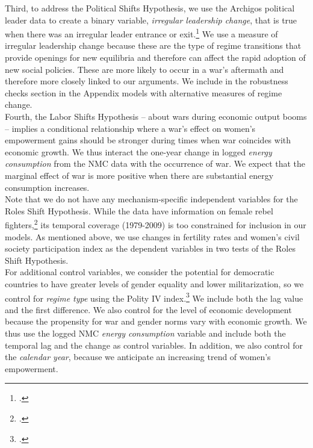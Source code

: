 \documentclass [12pt] {article}
\begin{document}
Third, to address the Political Shifts Hypothesis, we use the  Archigos political leader data  to create a binary variable, {\it irregular leadership change}, that is true when there was an irregular leader entrance or exit.\footnote{.} We use a measure of irregular leadership change because these are the type of regime transitions that provide openings for new equilibria and therefore can affect the rapid adoption of new social policies. These are more likely to occur in a war's aftermath and therefore more closely linked to our arguments. We include in the robustness checks section in the Appendix models with alternative measures of regime change.\\

Fourth, the Labor Shifts Hypothesis -- about wars during economic output booms -- implies a conditional relationship where a war's effect on women's empowerment gains should be stronger during times when war coincides with economic growth. We thus interact the one-year change in logged {\it energy consumption} from the NMC data with the occurrence of war. We expect that the marginal effect of war is more positive when there are substantial energy consumption increases.  \\

Note that we do not have any mechanism-specific independent variables for the Roles Shift Hypothesis. While the \citeauthor{thomas:wood} data have information on female rebel fighters,\footnote{.} its temporal coverage (1979-2009) is too constrained for inclusion in our models. As mentioned above, we use changes in fertility rates and women's civil society participation index as the dependent variables in two tests of the Roles Shift Hypothesis.\\

For additional control variables, we consider the potential for democratic countries to have greater levels of gender equality and lower militarization, so we control for {\it regime type} using the Polity IV index.\footnote{.}  We include both the lag value and the first difference.  We also control for the level of economic development because the propensity for war and gender norms vary with economic growth. We thus use the logged NMC {\it energy consumption} variable and include both the temporal lag and the change as control variables. In addition, we also control for the {\it calendar year}, because we anticipate an increasing trend of women's empowerment. \\ 
\end{document}
